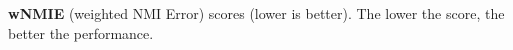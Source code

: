 \begin{table}[!ht]  
    \centering
    \caption{\textbf{wNMIE} (weighted NMI Error) scores (lower is better). The lower the score, the better the performance.} 
    \label{tbl:wnmie} %
    \begin{threeparttable}
    {
    \resizebox{\columnwidth}{!}
    {


  }
  }
	\end{threeparttable}
\end{table}